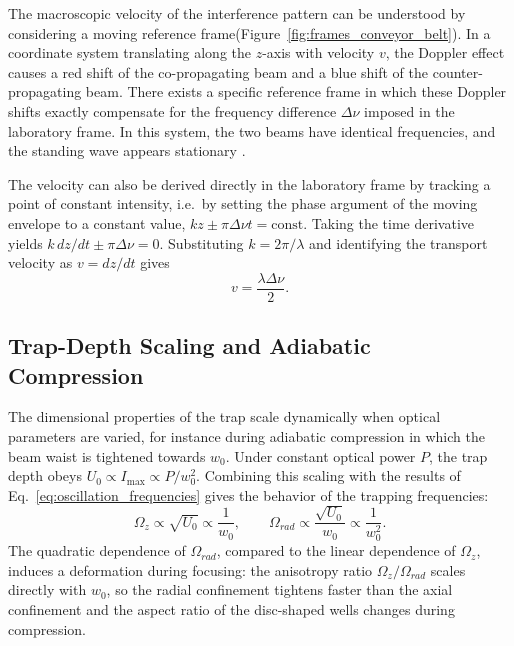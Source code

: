 The macroscopic velocity of the interference pattern can be understood by considering a moving reference frame(Figure~\ref{fig:frames_conveyor_belt}). In a coordinate system translating along the $z$-axis with velocity $v$, the Doppler effect causes a red shift of the co-propagating beam and a blue shift of the counter-propagating beam. There exists a specific reference frame in which these Doppler shifts exactly compensate for the frequency difference $\Delta\nu$ imposed in the laboratory frame. In this system, the two beams have identical frequencies, and the standing wave appears stationary \cite{Kuhr:03}.

The velocity can also be derived directly in the laboratory frame by tracking a point of constant intensity, i.e.\ by setting the phase argument of the moving envelope to a constant value, $kz \pm \pi\Delta\nu t = \text{const}$. Taking the time derivative yields $k\,dz/dt \pm \pi\Delta\nu = 0$. Substituting $k = 2\pi/\lambda$ and identifying the transport velocity as $v = dz/dt$ gives
\begin{equation}
v = \frac{\lambda \Delta\nu}{2}.
\label{eq:conveyor_velocity}
\end{equation}

\subsection{Trap-Depth Scaling and Adiabatic Compression}

The dimensional properties of the trap scale dynamically when optical parameters are varied, for instance during adiabatic compression in which the beam waist is tightened towards $w_0$. Under constant optical power $P$, the trap depth obeys $U_0 \propto I_{\max} \propto P/w_0^2$. Combining this scaling with the results of Eq.~\eqref{eq:oscillation_frequencies} gives the behavior of the trapping frequencies:
\begin{equation}
\Omega_z \propto \sqrt{U_0} \propto \frac{1}{w_0}, \qquad
\Omega_{rad} \propto \frac{\sqrt{U_0}}{w_0} \propto \frac{1}{w_0^2}.
\end{equation}
The quadratic dependence of $\Omega_{rad}$, compared to the linear dependence of $\Omega_z$, induces a deformation during focusing: the anisotropy ratio $\Omega_z/\Omega_{rad}$ scales directly with $w_0$, so the radial confinement tightens faster than the axial confinement and the aspect ratio of the disc-shaped wells changes during compression.

